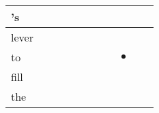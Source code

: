 \documentclass[landscape]{article}
\newcommand{\ssp}{\hspace{2pt}}
\newcommand{\mex}{\cellcolor{g}$\bullet$}
\begin{document}
\begin{tabular}{|l|p{10pt}|p{10pt}|p{10pt}|p{10pt}|p{10pt}|p{10pt}|p{10pt}|p{10pt}|p{10pt}|p{10pt}|}
\hline
\ssp 's \ssp&\hspace{2pt}&\hspace{2pt}&\hspace{2pt}&\hspace{2pt}&\hspace{2pt}&\hspace{2pt}&\hspace{2pt}&\hspace{2pt}&\hspace{2pt}&\hspace{2pt}\\
\hline
\ssp lever \ssp&\hspace{2pt}&\hspace{2pt}&\hspace{2pt}&\hspace{2pt}&\hspace{2pt}&\hspace{2pt}&\hspace{2pt}&\hspace{2pt}&\hspace{2pt}&\hspace{2pt}\\
\hline
\ssp \cellcolor{ref7}to \ssp&\hspace{2pt}&\hspace{2pt}&\hspace{2pt}&\hspace{2pt}&\hspace{2pt}&\hspace{2pt}&\hspace{2pt}&\hspace{2pt}\mex&\hspace{2pt}&\hspace{2pt}\\
\hline
\ssp fill \ssp&\hspace{2pt}&\hspace{2pt}&\hspace{2pt}&\hspace{2pt}&\hspace{2pt}&\hspace{2pt}&\hspace{2pt}&\hspace{2pt}&\hspace{2pt}&\hspace{2pt}\\
\hline
\ssp the \ssp&\hspace{2pt}&\hspace{2pt}&\hspace{2pt}&\hspace{2pt}&\hspace{2pt}&\hspace{2pt}&\hspace{2pt}&\hspace{2pt}&\hspace{2pt}&\hspace{2pt}\\

\end{tabular}
\end{document}
